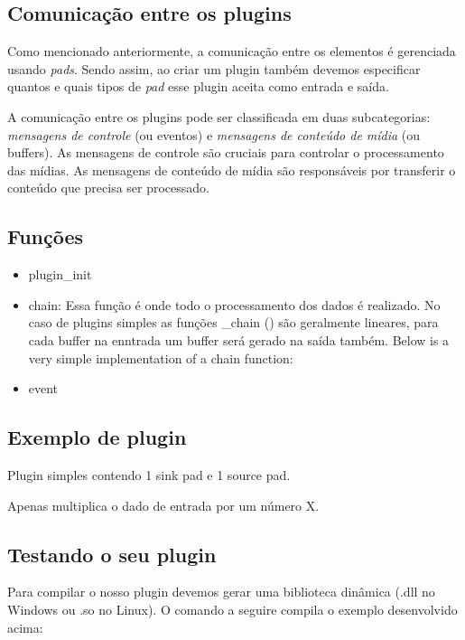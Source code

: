 

\subsection*{Comunicação entre os plugins}
Como mencionado anteriormente, a comunicação entre os elementos é gerenciada
usando \emph{pads}.  Sendo assim, ao criar um plugin também devemos especificar
quantos e quais tipos de \emph{pad} esse plugin aceita como entrada e saída.


A comunicação entre os plugins pode ser classificada em duas subcategorias:
\emph{mensagens de controle} (ou eventos) e \emph{mensagens de conteúdo de
mídia} (ou buffers).  As mensagens de controle são cruciais para controlar o
processamento das mídias.  As mensagens de conteúdo de mídia são responsáveis
por transferir o conteúdo que precisa ser processado.

\subsection*{Funções}
\begin{itemize}
  \item plugin\_init
  \item chain: Essa função é onde todo o processamento dos dados é realizado.
        No caso de plugins simples as funções \_chain () são geralmente lineares,
        para cada buffer na enntrada um buffer será gerado na saída também.
        Below is a very simple implementation of a chain function: 
  \item event
\end{itemize}

\subsection*{Exemplo de plugin}
Plugin simples contendo 1 sink pad e 1 source pad.

Apenas multiplica o dado de entrada por um número X.

\subsection*{Testando o seu plugin}
Para compilar o nosso plugin devemos gerar uma biblioteca dinâmica (.dll no
Windows ou .so no Linux).  O comando a seguire compila o exemplo desenvolvido
acima:

